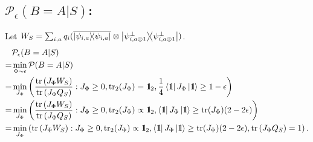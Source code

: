\documentclass[12pt,a4paper,reqno, aps, superscriptaddress]{amsart}
\newcommand{\Id}{{\rm 1\hspace{-0.9mm}l}}
\newcommand{\PP}{\ensuremath{\mathcal{P}}}
\newcommand{\proj}[1]{\ensuremath{\ketbra{#1}{#1}}}
\begin{document}
\subsection{$\PP_\epsilon(B=A|S)$:}
Let $W_S = \sum_{i,a} q_i(\overline{\proj{\psi_{i,a}}} 
\otimes \proj{\psi_{i,a\oplus 1}^\perp})$.
\begin{equation}
\begin{split}
&\PP_\epsilon(B=A|S)\\ =& \min_{\Phi \sim \epsilon} \PP(B=A|S)\\
=&\min_{J_\Phi} \left( \frac{\tr\left(J_\Phi W_S\right)}{\tr\left(J_\Phi 
Q_S\right)}: J_\Phi \ge 0, \tr_2(J_\Phi) 
= \Id_2,
\frac14 \bra{\Id} J_\Phi \ket{\Id} \ge 1-\epsilon \right)\\
=&\min_{J_\Phi} \left( \frac{\tr\left(J_\Phi W_S\right)}{\tr\left(J_\Phi 
Q_S\right)}: J_\Phi \ge 0, \tr_2(J_\Phi) 
\propto \Id_2,
\bra{\Id} J_\Phi \ket{\Id} \ge \tr(J_\Phi)(2-2\epsilon) \right)\\
=&\min_{J_\Phi} \left( \tr\left(J_\Phi W_S\right): J_\Phi \ge 0, 
\tr_2(J_\Phi) 
\propto \Id_2,
\bra{\Id} J_\Phi \ket{\Id} \ge \tr(J_\Phi)(2-2\epsilon), \tr\left(J_\Phi 
Q_S\right)=1 \right).
\end{split}
\end{equation}
\end{document}
